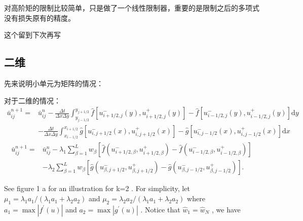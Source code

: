 \documentclass{book}
\begin{document}
对高阶矩的限制比较简单，只是做了一个线性限制器，重要的是限制之后的多项式没有损失原有的精度。

\begin{remark}
    这个留到下次再写
\end{remark}
\subsection{二维}
先来说明小单元为矩阵的情况：

对于二维的情况：
\begin{equation}
    \begin{aligned}
        \bar{u}_{i j}^{n+1}= & \bar{u}_{i j}^{n}-\frac{\Delta t}{\Delta x \Delta y} \int_{y_{j-1 / 2}}^{y_{j+1 / 2}} \hat{f}\left[u_{i+1 / 2, j}^{-}(y), u_{i+1 / 2, j}^{+}(y)\right]-\hat{f}\left[u_{i-1 / 2, j}^{-}(y), u_{i-1 / 2, j}^{+}(y)\right] \mathrm{d} y \\
                             & -\frac{\Delta t}{\Delta x \Delta y} \int_{x_{i-1 / 2}}^{x_{i+1 / 2}} \hat{g}\left[u_{i, j+1 / 2}^{-}(x), u_{i, j+1 / 2}^{+}(x)\right]-\hat{g}\left[u_{i, j-1 / 2}^{-}(x), u_{i, j-1 / 2}^{+}(x)\right] \mathrm{d} x
    \end{aligned}
\end{equation}
\begin{equation}
    \begin{aligned}
        \bar{u}_{i j}^{n+1}= & \bar{u}_{i j}^{n}-\lambda_{1} \sum_{\beta=1}^{L} w_{\beta}\left[\hat{f}\left(u_{i+1 / 2, \beta}^{-}, u_{i+1 / 2, \beta}^{+}\right)-\hat{f}\left(u_{i-1 / 2, \beta}^{-}, u_{i-1 / 2, \beta}^{+}\right)\right] \\
                             & -\lambda_{2} \sum_{\beta=1}^{L} w_{\beta}\left[\hat{g}\left(u_{\beta, j+1 / 2}^{-}, u_{\beta, j+1 / 2}^{+}\right)-\hat{g}\left(u_{\beta, j-1 / 2}^{-}, u_{\beta, j-1 / 2}^{+}\right)\right] .
    \end{aligned}
\end{equation}


See figure  1 a  for an illustration for  k=2 . For simplicity, let  $\mu_{1}=\lambda_{1} a_{1} /\left(\lambda_{1} a_{1}+\right.   \left.\lambda_{2} a_{2}\right)$  and  $\mu_{2}=\lambda_{2} a_{2} /\left(\lambda_{1} a_{1}+\lambda_{2} a_{2}\right) $ where  $a_{1}=\max \left|f^{\prime}(u)\right|$  and  $a_{2}=\max \left|g^{\prime}(u)\right|$ . Notice that  $\hat{w}_{1}=\hat{w}_{N}$ , we have
\end{document}
